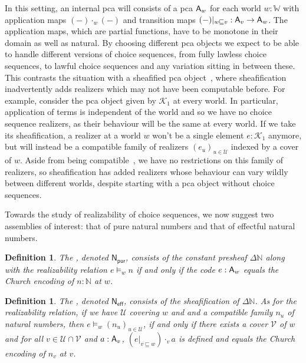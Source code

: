 \documentclass{easychair}
\newtheorem{defn}[thrm]{Definition}
\begin{document}
In this setting, an internal pca will consists of a pca \(\mathsf{A}_{w}\) for each
world \(w:\mathbb{W}\) with application maps \((-)\cdot_{w}(-)\) and transition
maps \((-)|_{w \sqsubseteq v} : \mathsf{A}_{v} \to \mathsf{A}_{w}\).
%
The application maps, which are partial functions, have to be monotone in their
domain as well as natural.
%
By choosing different pca objects we expect to be able to handle different
versions of choice sequences, from fully lawless choice sequences, to lawful
choice sequences and any variation sitting in between these.
%
This contrasts the situation with a sheafified pca
object~\cite{vanoostenSemanticalProofJonghs1991}, where sheafification
inadvertently adds realizers which may not have been computable before.
%
For example, consider the pca object given by \(\mathcal{K}_{1}\) at every
world.
%
In particular, application of terms is independent of the world and so we have
no choice sequence realizers, as their behaviour will be the same at every
world.
%
If we take its sheafification, a realizer at a world \(w\) won't be a single
element \(e : \mathcal{K}_{1}\) anymore, but will instead be a compatible family
of realizers \({(e_{u})}_{u\in\mathcal{U}}\) indexed by a cover of \(w\).
%
Aside from being compatible~\cite[Definition 2.1.2 in \S
C2.1]{johnstoneSketchesElephantTopos2002}, we have no restrictions on this
family of realizers, so sheafification has added realizers whose behaviour can
vary wildly between different worlds, despite starting with a pca object without
choice sequences.

Towards the study of realizability of choice sequences, we now suggest two
assemblies of interest: that of pure natural numbers and that of effectful
natural numbers.

\begin{defn}
  The , denoted
  \(\mathsf{N}_\mathsf{pur}\), consists of the constant presheaf
  \(\Delta\mathbb{N}\) along with the realizability relation \(e \vDash_{w} n\)
  if and only if the code \(e : \mathsf{A}_{w}\) equals the Church encoding of
  \(n : \mathbb{N}\) at \(w\).
\end{defn}

\begin{defn}
  The , denoted
  \(\mathsf{N}_\mathsf{eff}\), consists of the sheafification of \(\Delta\mathbb{N}\).
  As for the realizability relation, if we have \(\mathcal{U}\) covering \(w\)
  and and a compatible family \(n_{u}\) of natural numbers, then
  \(e \vDash_{w} {(n_{u})}_{u\in\mathcal{U}}\), if and only if there exists a
  cover \(\mathcal{V}\) of \(w\) and for all
  \(v \in \mathcal{U} \cap \mathcal{V}\) and \(a : \mathsf{A}_{v}\),
  \({(e|_{v \sqsubseteq w})} \cdot_{v} a\) is defined and equals the Church encoding of
  \(n_{v}\) at \(v\).
\end{defn}
\end{document}

